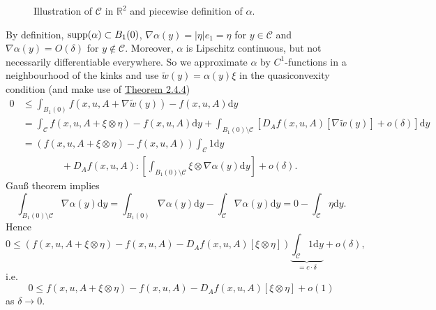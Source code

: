 \begin{itemize}
\begin{figure}[ht]
		\caption{Illustration of $\mathcal{C}$ in $\mathbb{R}^2$ and piecewise definition of $\alpha$.}
	\end{figure}

	By definition, $\operatorname{supp}\mathopen{}\left(\alpha\right)\mathclose{}\subset B_1(0)$, $\nabla\alpha(y)=\lvert\eta\rvert e_1=\eta$ for $y\in\mathcal{C}$ and $\nabla\alpha(y)=O(\delta)$ for $y\notin\mathcal{C}$. Moreover, $\alpha$ is Lipschitz continuous, but not necessarily differentiable everywhere. So we approximate $\alpha$ by $C^1$-functions in a neighbourhood of the kinks and use $\widetilde{w}(y)=\alpha(y)\xi$ in the quasiconvexity condition (and make use of \hyperlink{theorem_2_4_4}{Theorem 2.4.4})
	\begin{align*}
		0&\leq\int_{B_1(0)}{f(x,u,A+\nabla\widetilde{w}(y))-f(x,u,A)\mathrm{d}y}\\
		&=\int_\mathcal{C}{f(x,u,A+\xi\otimes\eta)-f(x,u,A)\mathrm{d}y}+\int_{B_1(0)\setminus\mathcal{C}}{\left[D_Af(x,u,A)[\nabla\widetilde{w}(y)]+o(\delta)\right]\mathrm{d}y}\\
		&=(f(x,u,A+\xi\otimes\eta)-f(x,u,A))\int_\mathcal{C}{1\mathrm{d}y}\\
		&\qquad\qquad+D_Af(x,u,A):\left[\int_{B_1(0)\setminus\mathcal{C}}{\xi\otimes\nabla\alpha(y)\mathrm{d}y}\right]+o(\delta).
	\end{align*}
	Gau{\ss} theorem implies
	\[\int_{B_1(0)\setminus\mathcal{C}}{\nabla\alpha(y)\mathrm{d}y}=\int_{B_1(0)}{\nabla\alpha(y)\mathrm{d}y}-\int_\mathcal{C}{\nabla\alpha(y)\mathrm{d}y}=0-\int_\mathcal{C}{\eta\mathrm{d}y}.\]
	Hence
	\[0\leq\left(f(x,u,A+\xi\otimes\eta)-f(x,u,A)-D_Af(x,u,A)[\xi\otimes\eta]\right)\underbrace{\int_\mathcal{C}{1\mathrm{d}y}}_{=c\cdot\delta}+o(\delta),\]
	i.e.
	\[0\leq f(x,u,A+\xi\otimes\eta)-f(x,u,A)-D_Af(x,u,A)[\xi\otimes\eta]+o(1)\]
	as $\delta\to0$.\\
\end{itemize}


